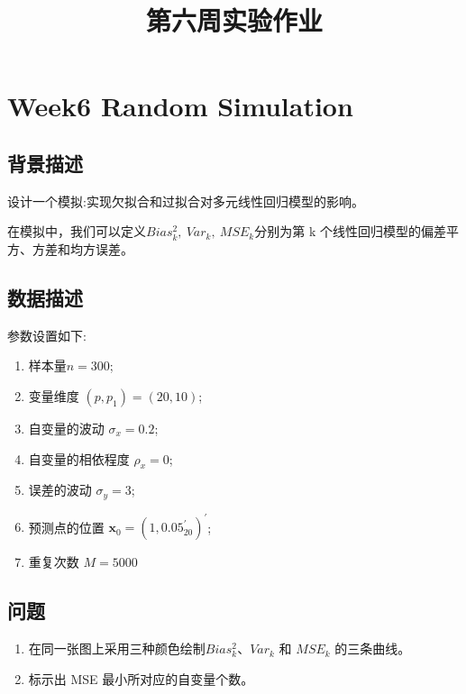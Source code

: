 \documentclass[11pt]{ctexart}
\title{第六周实验作业}
\begin{document}
    
    \maketitle
    
    

    
    \hypertarget{week6-random-simulation}{%
\section{Week6 Random Simulation}\label{week6-random-simulation}}

\hypertarget{ux80ccux666fux63cfux8ff0}{%
\subsection{背景描述}\label{ux80ccux666fux63cfux8ff0}}

设计一个模拟:实现欠拟合和过拟合对多元线性回归模型的影响。

在模拟中，我们可以定义\(Bias^2_k,\ Var_k,\ MSE_k\)分别为第 k
个线性回归模型的偏差平方、方差和均方误差。

\hypertarget{ux6570ux636eux63cfux8ff0}{%
\subsection{数据描述}\label{ux6570ux636eux63cfux8ff0}}

参数设置如下:

\begin{enumerate}
\def\labelenumi{\roman{enumi}.}
\item
  样本量\(n=300\);
\item
  变量维度 \((p, p_1) = (20, 10)\);
\item
  自变量的波动 \(\sigma_x = 0.2\);
\item
  自变量的相依程度 \(\rho_x = 0\);
\item
  误差的波动 \(\sigma_y = 3\);
\item
  预测点的位置 \(\pmb{x}_0 = (1, \pmb{0.05}^′_{20})^′\);
\item
  重复次数 \(M = 5000\)
\end{enumerate}

    \hypertarget{ux95eeux9898}{%
\subsection{问题}\label{ux95eeux9898}}

\begin{enumerate}
\def\labelenumi{(\alph{enumi})}
\item
  在同一张图上采用三种颜色绘制\(Bias^2_k\)、\(Var_k\) 和 \(MSE_k\)
  的三条曲线。
\item
  标示出 MSE 最小所对应的自变量个数。
\end{enumerate}
\end{document}
